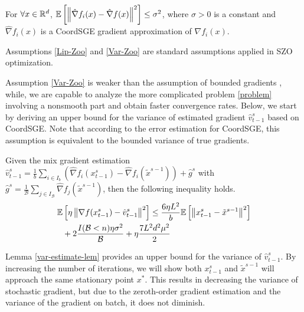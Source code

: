 \begin{assumption}\label{Var-Zoo}
For $\forall x\in\mathbb{R}^d$, $\mathbb{E}\left[\left\lVert\hat{\nabla} f_i(x) - \hat{\nabla} f(x)\right\rVert^2\right] \leq \sigma^2$, where $\sigma > 0$ is a constant and $\hat{\nabla} f_i(x)$ is a CoordSGE gradient approximation of $\nabla f_i(x)$.
\end{assumption}
Assumptions \ref{Lip-Zoo} and \ref{Var-Zoo} are standard assumptions applied in SZO optimization. 
\iffalse
The first assumption is for the convergence studies of the zeroth-order algorithms \cite{ghadimi2016accelerated,nesterov2017random,liu2018zeroth}. The second assumption provides the bounded variance of zeroth-order gradient approximations \cite{lian2016comprehensive,liu2018stochastic,liu2018zeroth,hajinezhad2017zeroth}. 
Assumption \ref{Var-Zoo} is essential in order to obtain a convergence result independent of $n$.
Note that due to the error estimation for CoordSGE, this assumption is equivalent to the bounded  variance of true gradients. 
\fi
Assumption \ref{Var-Zoo} is weaker than the assumption of bounded gradients  \cite{liu2017zeroth,hajinezhad2019zone},
while, we are capable to analyze the more complicated problem \eqref{problem} involving a nonsmooth part and obtain faster convergence rates. 
Below, we start by deriving an upper bound for the variance of estimated gradient $\hat{v}_{t-1}^s$ based on CoordSGE. Note that according to the error estimation for CoordSGE, this assumption is equivalent to the bounded  variance of true gradients.
\begin{lemma}\label{var-estimate-lem}
Given the mix gradient estimation $\hat{v}_{t-1}^s = \frac{1}{b} \sum_{i\in I_b}\left(\hat{\nabla} f_{i}(x_{t-1}^s)-\hat{\nabla} f_{i}(\tilde{x}^{s-1})\right)+\hat{g}^s$ with $\hat{g}^s = \frac{1}{\mathcal{B}} \sum_{j\in I_{\mathcal{B}}} \hat{\nabla} f_j (\tilde{x}^{s-1})$, then the following inequality holds. 
\begin{align}
\mathbb{E}&\left[\eta\left\lVert\nabla f(x_{t-1}^s)-{\hat{v}_{t-1}^s}\right\rVert^2\right] \leq  \frac{6\eta L^2}{b}\mathbb{E}\left[\left\lVert x_{t-1}^s-\tilde{x}^{s-1}\right\rVert^2\right]\notag\\
&+ 2\frac{I(\mathcal{B} < n)\eta \sigma ^2}{\mathcal{B}}+\eta \frac{7 L^2 d^2 \mu^2}{2}
\end{align}
\end{lemma}

Lemma \ref{var-estimate-lem} provides an upper bound for the variance of $\hat{v}_{t-1}^s$. By increasing the number of iterations, we will show both $x_{t-1}^s$ and $\tilde{x}^{s-1}$ will approach the same stationary point $x^*$.  This results in decreasing the variance of stochastic gradient, but due to the zeroth-order gradient estimation and the variance of the gradient on batch, it does not diminish.

